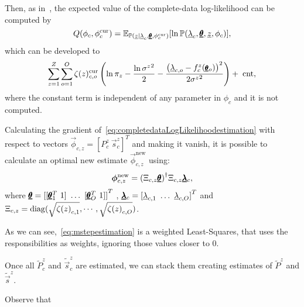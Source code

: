\documentclass{ifacconf}  %
\begin{document}
Then, as in~\cite[Chapter 9]{Bishop2006}, the expected value of the complete-data log-likelihood can be computed by
\begin{equation}
 Q(\phi_{c},\phi_{c}^{\mathrm{cur}})=\expectation[\probability{\random{z}\mid \random{\lambda}_{c},\randomvec{\theta},\phi_{c}^{\mathrm{cur}}}]{\ln\probability{\random{\lambda}_{c},\randomvec{\theta},\random{z},\phi_{c}}},
\end{equation}
which can be developed to
\begin{equation}\label{eq:completedataLogLikelihoodestimation}
  \small
  \sum_{z=1}^{Z}\sum_{o=1}^{O}\zeta(z)_{c,o}^{\mathrm{cur}}\left(\ln \pi_{z}-\frac{\ln{\sigma^{z}}^{2}}{2}-\frac{{{\left(\random{\lambda}_{c,o}-f_{c}^{z}(\randomvec{\theta}_{o})\right)}^{2}}}{2{\sigma^{z}}^{2}}\right)+\ \mathrm{cnt},
\end{equation}
where the constant term is independent of any parameter in $\phi_{c}$ and it is not computed.

Calculating the gradient of~\eqref{eq:completedataLogLikelihoodestimation} with respect to vectors $\vec{\phi}_{c,z}={[{P_{c}^{z}}\ \vec{s}_{c}^{z}]}^{T}$ and making it vanish, it is possible to calculate an optimal new estimate $\vec{\phi}_{c,z}^{\mathrm{new}}$ using:
\begin{equation}
  \label{eq:mstepestimation}
  \vec{\phi}_{c,z}^{\mathrm{new}}=\pseudoinv{(\Xi_{c,z}\randomvec{\theta})}\Xi_{c,z}\randomvec{\lambda}_{c},
\end{equation}
where
${\randomvec{\theta}={[ {[\randomvec{\theta}_{1}^{T}\ 1]}\ \dots\ [\randomvec{\theta}_{O}^{T}\ 1] ]}^{T}}$%
,
${\randomvec{\lambda}_{c}={[\random{\lambda}_{c,1}\ \dots\ \random{\lambda}_{c,O}]}^{T}}$%
and
${\Xi_{c,z}={\diag(\sqrt{{\zeta(z)}_{c,1}},\cdots,\sqrt{{\zeta(z)}_{c,O}})}}$.

As we can see,~\eqref{eq:mstepestimation} is a weighted Least-Squares, that uses the responsibilities as weights, ignoring those values closer to $0$.

Once all $\tilde{P}_{c}^{z}$ and $\tilde{\vec{s}}_{c}^{z}$ are estimated, we can stack them creating estimates of $\tilde{P}^{z}$ and $\tilde{\vec{s}}^{z}$.

Observe that

\end{document}
